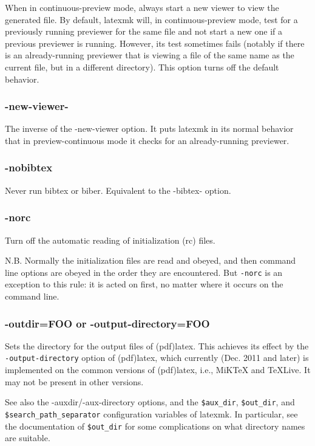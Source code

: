 When in continuous-preview mode, always start a  new  viewer  to view  the
generated file.  By default, latexmk will, in continuous-preview mode, test for
a previously  running  previewer  for the same file and not start a new one if
a previous previewer is running.  However, its test sometimes fails (notably if
there is an  already-running previewer that is viewing a file of the same name
as the current file, but in a different  directory).   This option turns off
the default behavior.


\subsubsection{-new-viewer-}

The  inverse  of the -new-viewer option.  It puts latexmk in its
normal behavior that in preview-continuous mode it checks for an
already-running previewer.

\subsubsection{-nobibtex}

Never run bibtex or biber.  Equivalent to the -bibtex- option.

\subsubsection{-norc}

Turn off the automatic reading of initialization (rc) files.

N.B.  Normally the initialization files are read and obeyed, and then command
line options are obeyed in the order they  are  encountered.   But \verb|-norc|
is an exception to this rule: it is acted on first, no matter where it occurs
on the command line.

\subsubsection{-outdir=FOO or -output-directory=FOO}

Sets the directory for the output  files  of  (pdf)latex.   This achieves  its
effect by the \verb|-output-directory| option of (pdf)latex, which currently
(Dec. 2011 and later) is implemented on the common versions of (pdf)latex,
i.e., MiKTeX and TeXLive.  It may not be present in other versions.

See also the -auxdir/-aux-directory options, and  the  \verb|$aux_dir|,
\verb|$out_dir|,  and \verb|$search_path_separator| configuration variables of
latexmk.  In particular, see the documentation of  \verb|$out_dir|  for
some complications on what directory names are suitable.

